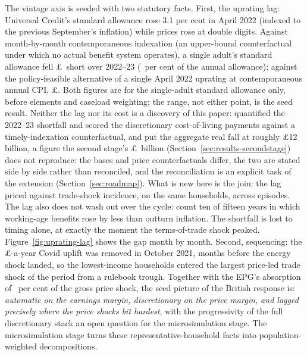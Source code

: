 The vintage axis is seeded with two statutory facts. First, the
uprating lag: Universal Credit's standard allowance rose 3.1 per cent
in April 2022 (indexed to the previous September's inflation) while
prices rose at double digits. Against month-by-month contemporaneous
indexation (an upper-bound counterfactual under which no actual
benefit system operates), a single adult's standard allowance fell
\pounds\MsUcLagCostGbp\ short over 2022--23
(\MsUcLagCostPctAllowance\ per cent of the annual allowance); against
the policy-feasible alternative of a single April 2022 uprating at
contemporaneous annual CPI, \pounds\MsUcLagCostFlatAltGbp. Both
figures are for the single-adult standard allowance only, before
elements and caseload weighting; the range, not either point, is the
seed result. Neither the lag nor its cost is a discovery of this
paper: \citet{cribb2023} quantified the 2022--23 shortfall and scored
the discretionary cost-of-living payments against a timely-indexation
counterfactual, and \citet{obrwelfare2022} put the aggregate real fall
at roughly \pounds 12 billion, a figure the second stage's
\pounds\SsUpratingShortfallBn\ billion (Section~\ref{sec:results-secondstage})
does not reproduce: the bases and price counterfactuals differ, the two
are stated side by side rather than reconciled, and the reconciliation
is an explicit task of the extension (Section~\ref{sec:roadmap}). What is new here is the
join: the lag priced against trade-shock incidence, on the same
households, across episodes. The lag also does not wash out over the
cycle: \citet{judgemurphy2023} count ten of fifteen years in which
working-age benefits rose by less than outturn inflation. The shortfall
is lost to timing alone, at exactly the moment the terms-of-trade shock
peaked. Figure~\ref{fig:uprating-lag} shows the gap month by month. Second,
sequencing: the \pounds\MsUcUpliftRemovalGbp-a-year
Covid uplift was removed in October 2021, months before the energy
shock landed, so the lowest-income households entered the largest
price-led trade shock of the period from a rulebook trough. Together
with the EPG's absorption of \MsEnergyCushionShareFyPct\ per cent of the
gross price shock, the seed picture of the British response is:
\emph{automatic on the earnings margin, discretionary on the price
margin, and lagged precisely where the price shocks bit hardest}, with
the progressivity of the full discretionary stack an open question for
the microsimulation stage. The microsimulation
stage turns these representative-household facts into
population-weighted decompositions.

